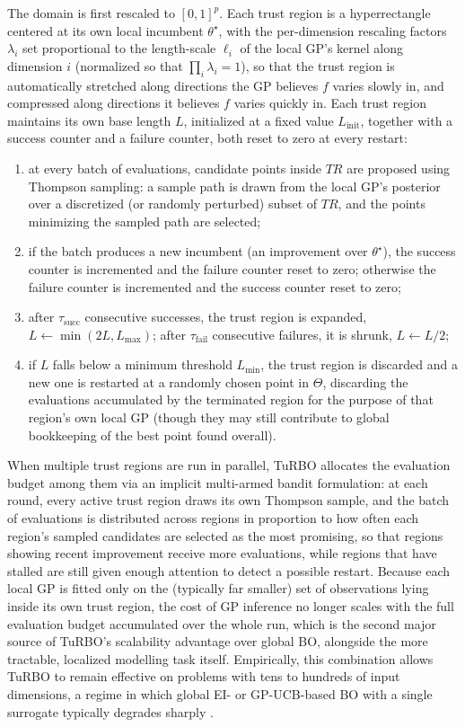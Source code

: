 \documentclass{article}
\begin{document}
	The domain is first rescaled to $[0,1]^p$. Each trust region is a hyperrectangle centered at its own local incumbent $\theta^\star$, with the per-dimension rescaling factors $\lambda_i$ set proportional to the length-scale $\ell_i$ of the local GP's kernel along dimension $i$ (normalized so that $\prod_i \lambda_i = 1$), so that the trust region is automatically stretched along directions the GP believes $f$ varies slowly in, and compressed along directions it believes $f$ varies quickly in. Each trust region maintains its own base length $L$, initialized at a fixed value $L_{\text{init}}$, together with a success counter and a failure counter, both reset to zero at every restart:
	\begin{enumerate}
		\item at every batch of evaluations, candidate points inside $TR$ are proposed using Thompson sampling: a sample path is drawn from the local GP's posterior over a discretized (or randomly perturbed) subset of $TR$, and the points minimizing the sampled path are selected;
		\item if the batch produces a new incumbent (an improvement over $\theta^\star$), the success counter is incremented and the failure counter reset to zero; otherwise the failure counter is incremented and the success counter reset to zero;
		\item after $\tau_{\text{succ}}$ consecutive successes, the trust region is expanded, $L \leftarrow \min(2L, L_{\max})$; after $\tau_{\text{fail}}$ consecutive failures, it is shrunk, $L \leftarrow L / 2$;
		\item if $L$ falls below a minimum threshold $L_{\min}$, the trust region is discarded and a new one is restarted at a randomly chosen point in $\Theta$, discarding the evaluations accumulated by the terminated region for the purpose of that region's own local GP (though they may still contribute to global bookkeeping of the best point found overall).
	\end{enumerate}
	
	When multiple trust regions are run in parallel, TuRBO allocates the evaluation budget among them via an implicit multi-armed bandit formulation: at each round, every active trust region draws its own Thompson sample, and the batch of evaluations is distributed across regions in proportion to how often each region's sampled candidates are selected as the most promising, so that regions showing recent improvement receive more evaluations, while regions that have stalled are still given enough attention to detect a possible restart. Because each local GP is fitted only on the (typically far smaller) set of observations lying inside its own trust region, the cost of GP inference no longer scales with the full evaluation budget accumulated over the whole run, which is the second major source of TuRBO's scalability advantage over global BO, alongside the more tractable, localized modelling task itself. Empirically, this combination allows TuRBO to remain effective on problems with tens to hundreds of input dimensions, a regime in which global EI- or GP-UCB-based BO with a single surrogate typically degrades sharply \cite{Eriksson2019}.
	
\end{document}
